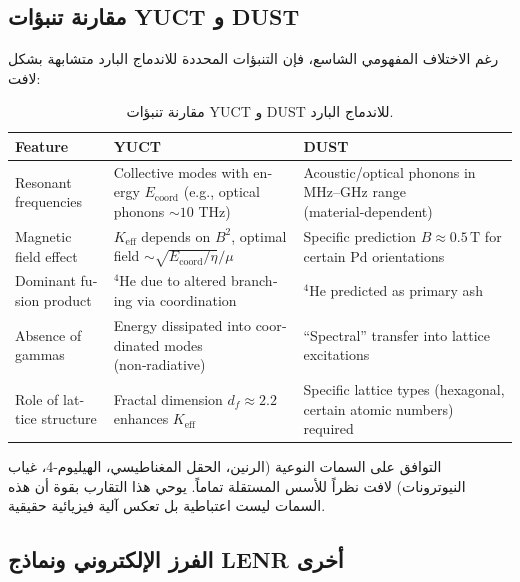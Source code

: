 \documentclass[11pt,a4paper]{article}
\newcommand{\Keff}{K_{\mathrm{eff}}}
\newcommand{\df}{d_{\!f}}
\theoremstyle{remark}
\begin{document}
	\subsection{مقارنة تنبؤات YUCT و DUST}
	
	رغم الاختلاف المفهومي الشاسع، فإن التنبؤات المحددة للاندماج البارد متشابهة بشكل لافت:
	
	\begin{table}[htbp]
		\begin{otherlanguage}{english}
			\centering
			\caption{Comparison of YUCT and DUST predictions for cold fusion.}
			\label{tab:comparison}
			\small
			\begin{tabularx}{\textwidth}{l X X}
				\toprule
				\textbf{Feature} & \textbf{YUCT} & \textbf{DUST} \\
				\midrule
				Resonant frequencies & Collective modes with energy \(E_{\mathrm{coord}}\) (e.g., optical phonons \(\sim 10\) THz) & Acoustic/optical phonons in MHz–GHz range (material‑dependent) \\
				Magnetic field effect & \(\Keff\) depends on \(B^2\), optimal field \(\sim \sqrt{E_{\mathrm{coord}}/\eta}/\mu\) & Specific prediction \(B \approx 0.5\,\text{T}\) for certain Pd orientations \\
				Dominant fusion product & \(^4\)He due to altered branching via coordination & \(^4\)He predicted as primary ash \\
				Absence of gammas & Energy dissipated into coordinated modes (non‑radiative) & “Spectral” transfer into lattice excitations \\
				Role of lattice structure & Fractal dimension \(\df \approx 2.2\) enhances \(\Keff\) & Specific lattice types (hexagonal, certain atomic numbers) required \\
				\bottomrule
			\end{tabularx}
		\end{otherlanguage}
		\caption{مقارنة تنبؤات YUCT و DUST للاندماج البارد.}
	\end{table}
	
	التوافق على السمات النوعية (الرنين، الحقل المغناطيسي، الهيليوم-4، غياب النيوترونات) لافت نظراً للأسس المستقلة تماماً. يوحي هذا التقارب بقوة أن هذه السمات ليست اعتباطية بل تعكس آلية فيزيائية حقيقية.
	
	\subsection{الفرز الإلكتروني ونماذج LENR أخرى}
	
\end{document}
